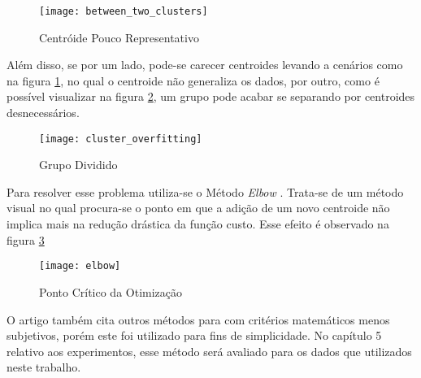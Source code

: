 \begin{figure}
\texttt{[image: between\_two\_clusters]}
\caption[Centróide Pouco Representativo]{Centróide Pouco Representativo} \label{fig:between_two_clusters}
\end{figure}

Além disso, se por um lado, pode-se carecer centroides levando a cenários como na figura \ref{fig:between_two_clusters}, no qual o centroide não generaliza os dados, por outro, como é possível visualizar na figura \ref{fig:cluster_overfitting}, um grupo pode acabar se separando por centroides desnecessários.

\begin{figure}[htbp]
\centering
\texttt{[image: cluster\_overfitting]}
\caption[Grupo Dividido]{Grupo Dividido} \label{fig:cluster_overfitting}
\end{figure}

Para resolver esse problema utiliza-se o Método \textit{Elbow} \citep{kodinariya2013review}. Trata-se de um método visual no qual procura-se o ponto em que a adição de um novo centroide não implica mais na redução drástica da função custo. Esse efeito é observado na figura \ref{fig:elbow}

\begin{figure}[htbp]
\centering
\texttt{[image: elbow]}
\caption[Ponto Crítico da Otimização]{Ponto Crítico da Otimização} \label{fig:elbow}
\end{figure}

O artigo \citep{kodinariya2013review} também cita outros métodos para com critérios matemáticos menos subjetivos, porém este foi utilizado para fins de simplicidade. No capítulo 5 relativo aos experimentos, esse método será avaliado para os dados que utilizados neste trabalho.